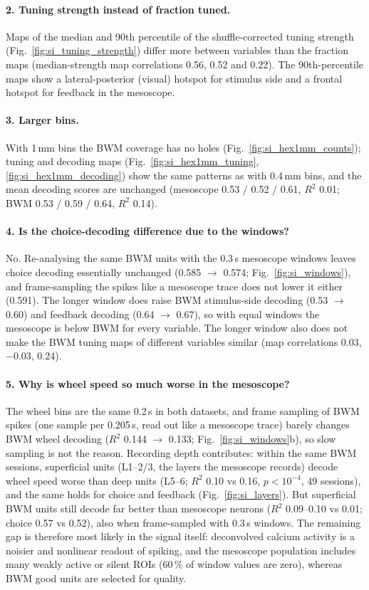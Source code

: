 \documentclass[10pt]{article}
\begin{document}
\paragraph{2. Tuning strength instead of fraction tuned.}
Maps of the median and 90th percentile of the shuffle-corrected tuning strength (Fig.~\ref{fig:si_tuning_strength}) differ more between variables than the fraction maps (median-strength map correlations 0.56, 0.52 and 0.22). The 90th-percentile maps show a lateral-posterior (visual) hotspot for stimulus side and a frontal hotspot for feedback in the mesoscope.

\paragraph{3. Larger bins.}
With 1\,mm bins the BWM coverage has no holes (Fig.~\ref{fig:si_hex1mm_counts}); tuning and decoding maps (Fig.~\ref{fig:si_hex1mm_tuning}, \ref{fig:si_hex1mm_decoding}) show the same patterns as with 0.4\,mm bins, and the mean decoding scores are unchanged (mesoscope 0.53 / 0.52 / 0.61, $R^2$ 0.01; BWM 0.53 / 0.59 / 0.64, $R^2$ 0.14).

\paragraph{4. Is the choice-decoding difference due to the windows?}
No. Re-analysing the same BWM units with the 0.3\,s mesoscope windows leaves choice decoding essentially unchanged (0.585 $\to$ 0.574; Fig.~\ref{fig:si_windows}), and frame-sampling the spikes like a mesoscope trace does not lower it either (0.591). The longer window does raise BWM stimulus-side decoding (0.53 $\to$ 0.60) and feedback decoding (0.64 $\to$ 0.67), so with equal windows the mesoscope is below BWM for every variable. The longer window also does not make the BWM tuning maps of different variables similar (map correlations 0.03, $-0.03$, 0.24).

\paragraph{5. Why is wheel speed so much worse in the mesoscope?}
The wheel bins are the same 0.2\,s in both datasets, and frame sampling of BWM spikes (one sample per 0.205\,s, read out like a mesoscope trace) barely changes BWM wheel decoding ($R^2$ 0.144 $\to$ 0.133; Fig.~\ref{fig:si_windows}b), so slow sampling is not the reason. Recording depth contributes: within the same BWM sessions, superficial units (L1--2/3, the layers the mesoscope records) decode wheel speed worse than deep units (L5--6; $R^2$ 0.10 vs 0.16, $p<10^{-4}$, 49 sessions), and the same holds for choice and feedback (Fig.~\ref{fig:si_layers}). But superficial BWM units still decode far better than mesoscope neurons ($R^2$ 0.09--0.10 vs 0.01; choice 0.57 vs 0.52), also when frame-sampled with 0.3\,s windows. The remaining gap is therefore most likely in the signal itself: deconvolved calcium activity is a noisier and nonlinear readout of spiking, and the mesoscope population includes many weakly active or silent ROIs (60\,\% of window values are zero), whereas BWM good units are selected for quality.
\end{document}
